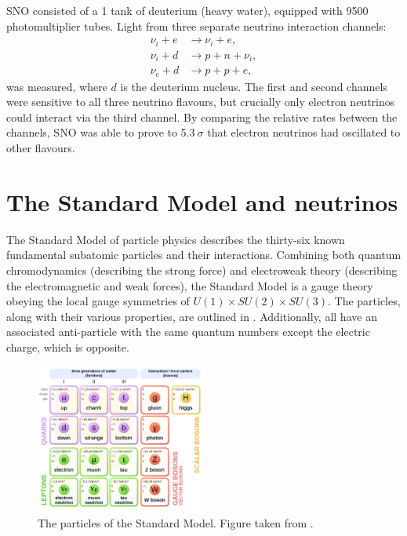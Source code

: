 SNO consisted of a \SI{1}{} tank of deuterium (heavy water), equipped with 9500
photomultiplier tubes. Light from three separate neutrino interaction channels:
\begin{align} %
    \nu_{i}+e & \rightarrow \nu_{i}+e, \\
    \nu_{i}+d & \rightarrow p+n+\nu_{i}, \\
    \nu_{e}+d & \rightarrow p+p+e,
\end{align}
was measured, where $d$ is the deuterium nucleus. The first and second channels were sensitive to
all three neutrino flavours, but crucially only electron neutrinos could interact via the third
channel. By comparing the relative rates between the channels, SNO was able to prove to
5.3$~\sigma$ that electron neutrinos had oscillated to other flavours.

\section{The Standard Model and neutrinos} %
\label{sec:theory_sm} %

The Standard Model of particle physics describes the thirty-six known fundamental subatomic
particles and their interactions. Combining both quantum chromodynamics (describing the strong
force) and electroweak theory (describing the electromagnetic and weak forces), the Standard Model
is a gauge theory obeying the local gauge symmetries of $U(1) \times SU(2) \times SU(3)$. The
particles, along with their various properties, are outlined in . Additionally,
all have an associated anti-particle with the same quantum numbers except the electric charge,
which is opposite.

\begin{figure} %
    \includegraphics[origin=c,width=0.5\textwidth]{diagrams/3-theory/sm.pdf}
    \caption[The particles of the Standard Model]
    {The particles of the Standard Model. Figure taken from .}
    \label{fig:sm}
\end{figure}

